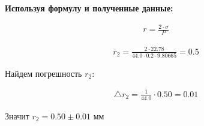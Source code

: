 \documentclass[a4paper, 12pt]{article}
\begin{document}
	\textbf{Используя формулу и полученные данные:}
	\begin{center}
		\begin{equation}
			\begin{aligned}
				r = \frac{2 \cdot \sigma}{P} 
			\end{aligned}
		\end{equation}
	\end{center}
	\begin{center}
		\begin{equation}
			\begin{aligned}
				r_2 = \frac{2 \cdot 22.78}{44.0 \cdot 0.2 \cdot 9.80665} = 0.5
			\end{aligned}
		\end{equation}
	\end{center}
	Найдем погрешность $r_2$:
	\begin{center}
		\begin{equation}
			\begin{aligned}
				\bigtriangleup r_2 = \frac{1}{44.0} \cdot 0.50 = 0.01
			\end{aligned}
		\end{equation}
	\end{center}
	Значит  $r_2 = 0.50 \pm 0.01$ мм
\end{document}
